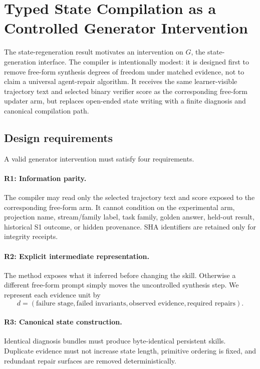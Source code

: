 \section{Typed State Compilation as a Controlled Generator Intervention}
\label{sec:compiler}

The state-regeneration result motivates an intervention on $G$, the state-generation interface. The compiler is intentionally modest: it is designed first to remove free-form synthesis degrees of freedom under matched evidence, not to claim a universal agent-repair algorithm. It receives the same learner-visible trajectory text and selected binary verifier score as the corresponding free-form updater arm, but replaces open-ended state writing with a finite diagnosis and canonical compilation path.

\subsection{Design requirements}
A valid generator intervention must satisfy four requirements.

\paragraph{R1: Information parity.}
The compiler may read only the selected trajectory text and score exposed to the corresponding free-form arm. It cannot condition on the experimental arm, projection name, stream/family label, task family, golden answer, held-out result, historical S1 outcome, or hidden provenance. SHA identifiers are retained only for integrity receipts.

\paragraph{R2: Explicit intermediate representation.}
The method exposes what it inferred before changing the skill. Otherwise a different free-form prompt simply moves the uncontrolled synthesis step. We represent each evidence unit by
\begin{equation}
d=(\text{failure stage},\text{failed invariants},\text{observed evidence},\text{required repairs}).
\end{equation}

\paragraph{R3: Canonical state construction.}
Identical diagnosis bundles must produce byte-identical persistent skills. Duplicate evidence must not increase state length, primitive ordering is fixed, and redundant repair surfaces are removed deterministically.


